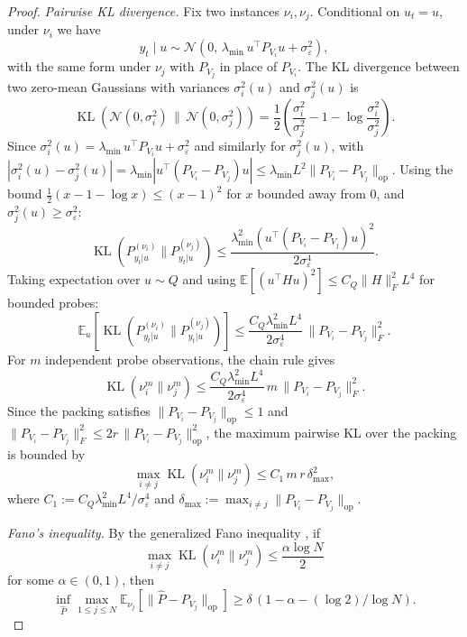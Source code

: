 \documentclass[12pt]{article}
\newcommand{\E}{\mathbb{E}}
\newcommand{\op}{\mathrm{op}}
\DeclareMathOperator{\KL}{KL}
\theoremstyle{plain}
\theoremstyle{definition}
\begin{document}
\begin{proof}
\emph{Pairwise KL divergence.}
Fix two instances $\nu_i, \nu_j$. Conditional on $u_t = u$, under $\nu_i$ we have
\[
y_t \mid u \sim \mathcal{N}\!\left(0,\, \lambda_{\min}\, u^\top P_{V_i} u + \sigma_\varepsilon^2\right),
\]
with the same form under $\nu_j$ with $P_{V_j}$ in place of $P_{V_i}$. The KL divergence between two zero-mean Gaussians with variances $\sigma_i^2(u)$ and $\sigma_j^2(u)$ is
\[
\KL\!\left(\mathcal{N}(0, \sigma_i^2) \,\|\, \mathcal{N}(0, \sigma_j^2)\right)
= \frac{1}{2}\left(\frac{\sigma_i^2}{\sigma_j^2} - 1 - \log\frac{\sigma_i^2}{\sigma_j^2}\right).
\]
Since $\sigma_i^2(u) = \lambda_{\min}\, u^\top P_{V_i} u + \sigma_\varepsilon^2$ and similarly for $\sigma_j^2(u)$, with $|\sigma_i^2(u) - \sigma_j^2(u)| = \lambda_{\min} |u^\top(P_{V_i} - P_{V_j})u| \le \lambda_{\min} L^2 \|P_{V_i} - P_{V_j}\|_{\op}$. Using the bound $\frac{1}{2}(x - 1 - \log x) \le (x-1)^2$ for $x$ bounded away from $0$, and $\sigma_j^2(u) \ge \sigma_\varepsilon^2$:
\[
\KL(P_{y_t|u}^{(\nu_i)} \| P_{y_t|u}^{(\nu_j)})
\le \frac{\lambda_{\min}^2 (u^\top(P_{V_i} - P_{V_j})u)^2}{2\sigma_\varepsilon^4}.
\]
Taking expectation over $u \sim Q$ and using $\E[(u^\top H u)^2] \le C_Q \|H\|_F^2 L^4$ for bounded probes:
\[
\E_u\!\left[\KL(P_{y_t|u}^{(\nu_i)} \| P_{y_t|u}^{(\nu_j)})\right]
\le \frac{C_Q \lambda_{\min}^2 L^4}{2\sigma_\varepsilon^4}\, \|P_{V_i} - P_{V_j}\|_F^2.
\]
For $m$ independent probe observations, the chain rule gives
\begin{equation}
\KL(\nu_i^m \| \nu_j^m) \le \frac{C_Q \lambda_{\min}^2 L^4}{2\sigma_\varepsilon^4}\, m\, \|P_{V_i} - P_{V_j}\|_F^2.
\label{eq:kl_bound}
\end{equation}
Since the packing satisfies $\|P_{V_i} - P_{V_j}\|_{\op} \le 1$ and $\|P_{V_i} - P_{V_j}\|_F^2 \le 2r\, \|P_{V_i} - P_{V_j}\|_{\op}^2$, the maximum pairwise KL over the packing is bounded by
\begin{equation}
\max_{i \neq j} \KL(\nu_i^m \| \nu_j^m) \le C_1\, m\, r\, \delta_{\max}^2,
\label{eq:kl_max}
\end{equation}
where $C_1 := C_Q \lambda_{\min}^2 L^4 / \sigma_\varepsilon^4$ and $\delta_{\max} := \max_{i \neq j} \|P_{V_i} - P_{V_j}\|_{\op}$.

\emph{Fano's inequality.}
By the generalized Fano inequality \citep[Theorem 2.7]{tsybakov2009introduction}, if
\begin{equation}
\max_{i \neq j} \KL(\nu_i^m \| \nu_j^m) \le \frac{\alpha \log N}{2}
\label{eq:fano_condition}
\end{equation}
for some $\alpha \in (0, 1)$, then
\[
\inf_{\widehat{P}} \max_{1 \le j \le N} \E_{\nu_j}\!\left[\|\widehat{P} - P_{V_j}\|_{\op}\right]
\ge \delta\, (1 - \alpha - (\log 2) / \log N).
\]


\end{proof}
\end{document}
